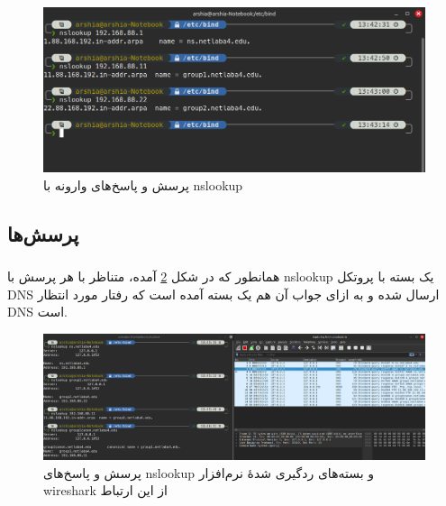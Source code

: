 \documentclass[12pt]{article}
\begin{document}
	\begin{figure}[H]
		\centering
		\includegraphics[width=\textwidth]{resources/9.png}
		\caption{پرسش و پاسخ‌های وارونه با nslookup}
		\label{dns:7}
	\end{figure}
	\subsection{پرسش‌ها}
	\subsubsection{}
	همانطور که در شکل \ref{dns:8} آمده، متناظر با هر پرسش با nslookup یک بسته با پروتکل DNS ارسال شده و به ازای جواب آن هم یک بسته آمده است که رفتار مورد انتظار DNS است. 
	\begin{figure}[H]
		\centering
		\includegraphics[width=\textwidth]{resources/10.png}
		\caption{پرسش و پاسخ‌های  nslookup و بسته‌های ردگیری شدهٔ نرم‌افزار wireshark از این ارتباط}
		\label{dns:8}
	\end{figure}
\end{document}
